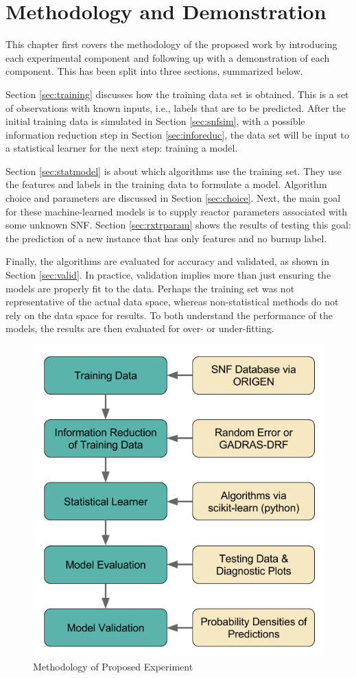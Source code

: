 \chapter{Methodology and Demonstration}
\label{ch:demo_method}

This chapter first covers the methodology of the proposed work by introducing
each experimental component and following up with a demonstration of each
component. This has been split into three sections, summarized below.

Section \ref{sec:training} discusses how the training data set is obtained.
This is a set of observations with known inputs, i.e., labels that are to be
predicted. After the initial training data is simulated in Section
\ref{sec:snfsim}, with a possible information reduction step in Section
\ref{sec:inforeduc}, the data set will be input to a statistical learner for
the next step: training a model.

Section \ref{sec:statmodel} is about which algorithms use the training set.
They use the features and labels in the training data to formulate a model.
Algorithm choice and parameters are discussed in Section \ref{sec:choice}.
Next, the main goal for these machine-learned models is to supply reactor
parameters associated with some unknown \gls{SNF}. Section \ref{sec:rxtrparam}
shows the results of testing this goal: the prediction of a new instance that
has only features and no burnup label.  

Finally, the algorithms are evaluated for accuracy and validated, as shown in
Section \ref{sec:valid}. In practice, validation implies more than just
ensuring the models are properly fit to the data.  Perhaps the training set was
not representative of the actual data space, whereas non-statistical methods do
not rely on the data space for results. To both understand the performance of
the models, the results are then evaluated for over- or under-fitting. 

\begin{figure}[!htb]
  \centering
  \includegraphics[width=0.8\linewidth]{./chapters/demo_method/methodology.png}
  \caption{Methodology of Proposed Experiment}
  \label{fig:method}
\end{figure}

